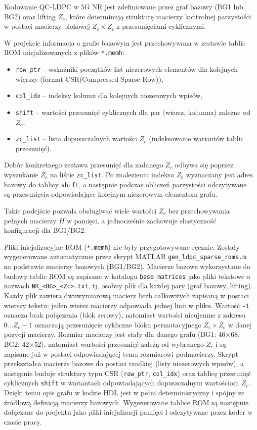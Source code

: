 Kodowanie QC-LDPC w 5G NR jest zdefiniowane przez graf bazowy (BG1 lub BG2) oraz lifting $Z_c$, które determinują strukturę macierzy kontrolnej parzystości w postaci macierzy blokowej $Z_c \times Z_c$ z przesunięciami cyklicznymi.

W projekcie informacja o grafie bazowym jest przechowywana w zestawie tablic ROM inicjalizowanych z plików \texttt{*.memh}:
\begin{itemize}
    \item \texttt{row\_ptr} -- wskaźniki początków list niezerowych elementów dla kolejnych wierszy (format CSR(Compressed Sparse Row)),
    \item \texttt{col\_idx} -- indeksy kolumn dla kolejnych niezerowych wpisów,
    \item \texttt{shift} -- wartości przesunięć cyklicznych dla par (wiersz, kolumna) zależne od $Z_c$,
    \item \texttt{zc\_list} -- lista dopuszczalnych wartości $Z_c$ (indeksowanie wariantów tablic przesunięć).
\end{itemize}

Dobór konkretnego zestawu przesunięć dla zadanego $Z_c$ odbywa się poprzez wyszukanie $Z_c$ na liście \texttt{zc\_list}. Po znalezieniu indeksu $Z_c$ wyznaczany jest adres bazowy do tablicy \texttt{shift}, a następnie podczas obliczeń parzystości odczytywane są przesunięcia odpowiadające kolejnym niezerowym elementom grafu.

Takie podejście pozwala obsługiwać wiele wartości $Z_c$ bez przechowywania pełnych macierzy $H$ w pamięci, a jednocześnie zachowuje elastyczność konfiguracji dla BG1/BG2.

Pliki inicjalizacyjne ROM (\texttt{*.memh}) nie były przygotowywane ręcznie. Zostały wygenerowane automatycznie przez skrypt MATLAB \texttt{gen\_ldpc\_sparse\_roms.m} na podstawie macierzy bazowych (BG1/BG2). Macierze bazowe wykorzystane do budowy tablic ROM są zapisane w katalogu \texttt{base\_matrices} jako pliki tekstowe o nazwach \texttt{NR\_<BG>\_<Zc>.txt}, tj. osobny plik dla każdej pary (graf bazowy, lifting). Każdy plik zawiera dwuwymiarową macierz liczb całkowitych zapisaną w postaci wierszy tekstu: jeden wiersz macierzy odpowiada jednej linii w pliku. Wartość \texttt{-1} oznacza brak połączenia (blok zerowy), natomiast wartości nieujemne z zakresu $0 \ldots Z_c-1$ oznaczają przesunięcie cykliczne bloku permutacyjnego $Z_c \times Z_c$ w danej pozycji macierzy. Rozmiar macierzy jest stały dla danego grafu (BG1: 46$\times$68, BG2: 42$\times$52), natomiast wartości przesunięć zależą od wybranego $Z_c$ i są zapisane już w postaci odpowiadającej temu rozmiarowi podmacierzy.
 Skrypt przekształca macierze bazowe do postaci rzadkiej (listy niezerowych wpisów), a następnie buduje struktury typu CSR (\texttt{row\_ptr}, \texttt{col\_idx}) oraz tablicę przesunięć cyklicznych \texttt{shift} w wariantach odpowiadających dopuszczalnym wartościom $Z_c$. Dzięki temu opis grafu w kodzie HDL jest w pełni deterministyczny i spójny ze źródłową definicją macierzy bazowych. Wygenerowane tablice ROM są następnie dołączane do projektu jako pliki inicjalizacji pamięci i odczytywane przez koder w czasie pracy.


